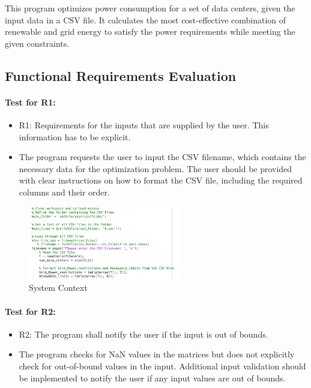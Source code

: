 \documentclass[12pt, titlepage]{article}
\begin{document}
This program optimizes power consumption for a set of data centers, given the input data in a CSV file. It calculates the most cost-effective combination of renewable and grid energy to satisfy the power requirements while meeting the given constraints.
\\

\subsection{Functional Requirements Evaluation}
\label{func}
\paragraph{Test for R1:}

\begin{itemize}
    \item R1: Requirements for the inputs that are supplied by the user. This information has to be explicit.
    \item The program requests the user to input the CSV filename, which contains the necessary data for the optimization problem. The user should be provided with clear instructions on how to format the CSV file, including the required columns and their order.
\end{itemize}
\begin{figure}[h!]
\begin{center}
 \includegraphics[width=0.6\textwidth]{for R1.png}
\caption{System Context}
\label{Fig_Proof for R1} 
\end{center}
\end{figure}
\paragraph{Test for R2:}

\begin{itemize}
    \item R2: The program shall notify the user if the input is out of bounds.


    \item The program checks for NaN values in the matrices but does not explicitly check for out-of-bound values in the input. Additional input validation should be implemented to notify the user if any input values are out of bounds.
\end{itemize}		 
\end{document}
